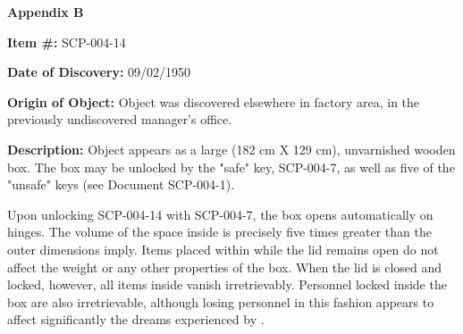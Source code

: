 \begin{flushleft}
\textbf{Appendix B}
\end{flushleft}

\textbf{Item \#:} SCP-004-14

\textbf{Date of Discovery:} 09/02/1950

\textbf{Origin of Object:} Object was discovered elsewhere in factory area, in the previously undiscovered manager's office.

\textbf{Description:} Object appears as a large (182 cm X 129 cm), unvarnished wooden box. The box may be unlocked by the "safe" key, SCP-004-7, as well as five of the "unsafe" keys (see Document SCP-004-1).

Upon unlocking SCP-004-14 with SCP-004-7, the box opens automatically on hinges. The volume of the space inside is precisely five times greater than the outer dimensions imply. Items placed within while the lid remains open do not affect the weight or any other properties of the box. When the lid is closed and locked, however, all items inside vanish irretrievably. Personnel locked inside the box are also irretrievable, although losing personnel in this fashion appears to affect significantly the dreams experienced by \expunged.